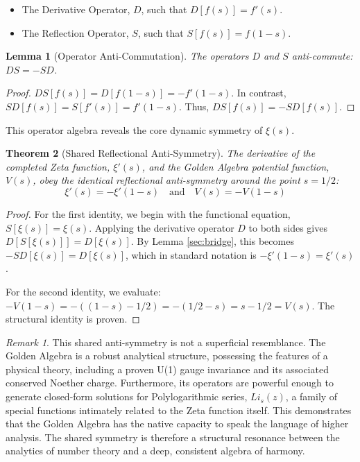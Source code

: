 \documentclass{article}
\theoremstyle{plain}
\newtheorem{theorem}{Theorem}[section]
\newtheorem{lemma}[theorem]{Lemma}
\theoremstyle{definition}
\theoremstyle{remark}
\newtheorem*{remark}{Remark}
\begin{document}
\begin{itemize}
    \item The Derivative Operator, $D$, such that $D[f(s)] = f'(s)$.
    \item The Reflection Operator, $S$, such that $S[f(s)] = f(1-s)$.
\end{itemize}

\begin{lemma}[Operator Anti-Commutation]
The operators $D$ and $S$ anti-commute: $DS = -SD$.
\end{lemma}
\begin{proof}
$DS[f(s)] = D[f(1-s)] = -f'(1-s)$. In contrast, $SD[f(s)] = S[f'(s)] = f'(1-s)$. Thus, $DS[f(s)] = -SD[f(s)]$.
\end{proof}

This operator algebra reveals the core dynamic symmetry of $\xi(s)$.

\begin{theorem}[Shared Reflectional Anti-Symmetry]
The derivative of the completed Zeta function, $\xi'(s)$, and the Golden Algebra potential function, $V(s)$, obey the identical reflectional anti-symmetry around the point $s=1/2$:
$$ \xi'(s) = -\xi'(1-s) \quad \text{and} \quad V(s) = -V(1-s) \quad \text{}$$
\end{theorem}
\begin{proof}
For the first identity, we begin with the functional equation, $S[\xi(s)] = \xi(s)$. Applying the derivative operator $D$ to both sides gives $D[S[\xi(s)]] = D[\xi(s)]$. By Lemma \ref{sec:bridge}, this becomes $-SD[\xi(s)] = D[\xi(s)]$, which in standard notation is $-\xi'(1-s) = \xi'(s)$.

For the second identity, we evaluate: $-V(1-s) = -((1-s) - 1/2) = -(1/2 - s) = s - 1/2 = V(s)$. The structural identity is proven.
\end{proof}

\begin{remark}
This shared anti-symmetry is not a superficial resemblance. The Golden Algebra is a robust analytical structure, possessing the features of a physical theory, including a proven U(1) gauge invariance and its associated conserved Noether charge. Furthermore, its operators are powerful enough to generate closed-form solutions for Polylogarithmic series, $Li_s(z)$, a family of special functions intimately related to the Zeta function itself. This demonstrates that the Golden Algebra has the native capacity to speak the language of higher analysis. The shared symmetry is therefore a structural resonance between the analytics of number theory and a deep, consistent algebra of harmony.
\end{remark}
\end{document}
